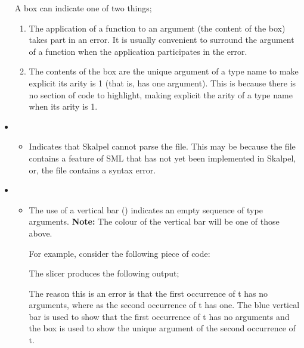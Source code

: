 \documentclass{article}
\begin{document}
\begin{itemize}
\subitem A box can indicate one of two things;

\begin{enumerate}
\item The application of a
  function to an argument (the content of the box) takes part in an
  error. It is usually convenient to surround the argument of a
  function when the application participates in the error.
\item The contents of the box are the unique argument of a type name
  to make explicit its arity is 1 (that is, has one argument). This is
  because there is no section of code to highlight, making explicit the
  arity of a type name when its arity is 1.
\end{enumerate}

\item {}

\begin{itemize}
\item Indicates that Skalpel cannot parse the file. This
  may be because the file contains a feature of SML that has not yet
  been implemented in Skalpel, or, the file contains a
  syntax error.
\end{itemize}

\item {}

\begin{itemize}
\item The use of a vertical bar (\incodebody{|}) indicates an empty sequence of type
  arguments. \textbf{Note:} The colour of the vertical bar will be one of those
  above.

  For example, consider the following piece of code:


  The slicer produces the following output;


  The reason this is an error is that the first occurrence of t has no
  arguments, where as the second occurrence of t has one. The blue
  vertical bar is used to show that the first occurrence of t has no arguments
  and the \tesEndPointOne box is used to show the unique argument of the second
  occurrence of t.
\end{itemize}

\end{itemize}
\end{document}
